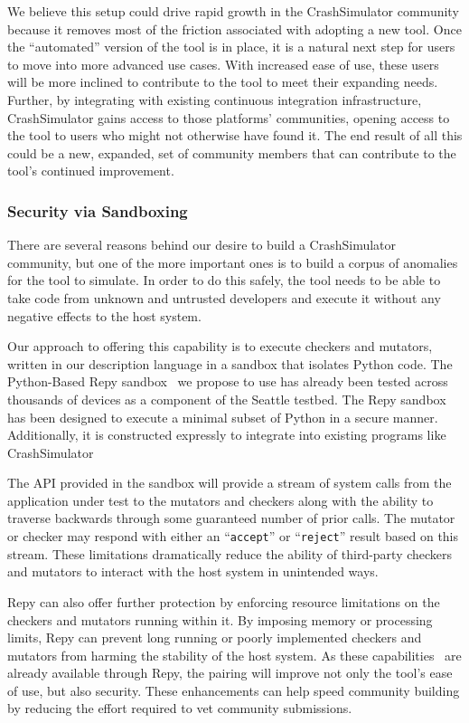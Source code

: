 We believe this setup could drive rapid growth in the CrashSimulator
community because it removes most of the friction associated with adopting
a new tool.  Once the ``automated'' version of the tool is in place, it is a
natural next step for users to move into more advanced use cases.
With increased ease of use, these users will be more inclined
to contribute to the tool to meet their expanding needs.
Further, by
integrating with existing continuous integration infrastructure,
CrashSimulator gains access to those platforms' communities,
opening access to the tool to users who might not otherwise have found it.
The end result of all this could be a new, expanded, set of community
members that can contribute to the tool's continued improvement.


\subsubsection{Security via Sandboxing}

There are several reasons behind our desire to build a CrashSimulator community,
but one of the more important ones
is to build a corpus of anomalies for the tool to simulate.
In order to do this safely, the tool needs to be able to
take code from unknown and untrusted developers and execute it
without any negative effects to the host system.

Our approach to offering this capability is
to execute checkers and mutators, written in our description language in a
sandbox that isolates Python code.  The Python-Based Repy
sandbox~\cite{Cappos_CCS_2010} we propose to use
has already been tested across thousands of devices as a component of
the Seattle testbed.  The Repy sandbox
has been designed to execute a minimal subset of Python in a secure manner.
Additionally, it is constructed expressly to integrate into
existing programs like CrashSimulator

The API provided in the sandbox will provide a
stream of system calls from the application under test
to the mutators and checkers along with the ability
to traverse backwards through some guaranteed number of prior
calls.  The mutator or checker may respond with either an ``{\tt accept}'' or
``{\tt reject}'' result based on this stream.  These limitations
dramatically reduce the ability of third-party checkers and mutators to
interact with the host system in unintended ways.

Repy can also offer further protection by enforcing resource limitations on
the checkers and mutators running within it.
By imposing memory or processing limits, Repy can prevent
long running or poorly implemented checkers and mutators from harming the
stability of the host system.
As these
capabilities~\cite{Li_USENIX_2015} are already available through Repy,
the pairing will improve
not only the tool's ease of use, but also security.
These enhancements can help speed
community building by reducing the effort required to vet
community submissions.

